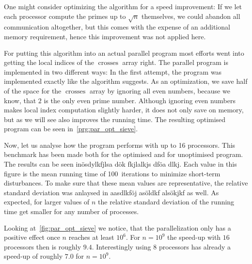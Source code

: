\documentclass[a4paper,12pt]{article}
\newcommand{\todo}[1]{{\color{red}#1}}
\DeclareMathOperator{\crosses}{crosses}
\begin{document}
One might consider optimizing the algorithm for a speed improvement:
If we let each processor compute the primes up to $\sqrt{n}$ themselves, we could abandon all communication altogether, but this comes with the expense of an additional memory requirement, hence this improvement was not applied here.

For putting this algorithm into an actual parallel program most efforts went into getting the local indices of the $\crosses$ array right.
The parallel program is implemented in two different ways:
In the first attempt, the program was implemented exactly like the algorithm suggests.
As an optimization, we save half of the space for the $\crosses$ array by ignoring all even numbers, because we know, that $2$ is the only even prime number.
Although ignoring even numbers makes local index computation slightly harder, it does not only save on memory, but as we will see also improves the running time.
The resulting optimised program can be seen in~\autoref{prg:par_opt_sieve}.

Now, let us analyse how the program performs with up to 16 processors.
This benchmark has been made both for the optimised and for unoptimised program.
The results can be seen in\todo{ösdylkfjlsa dök fkjlalkjs dföa dlkj}.
Each value in this figure is the mean running time of 100~iterations to minimize short-term disturbances.
To make sure that these mean values are representative, the relative standard deviation was anlaysed in \todo{aasdlkföj asöldkf alsökjkf} as well.
As expected, for larger values of $n$ the relative standard deviation of the running time get smaller for any number of processes.

Looking at~\autoref{fig:par_opt_sieve} we notice, that the parallelization only has a positive effect once $n$ reaches at least $10^6$.
For $n=10^9$ the speed-up with $16$ processors then is roughly $9.4$.
Interestingly using $8$ processors has already a speed-up of roughly $7.0$ for $n=10^9$.
\end{document}
